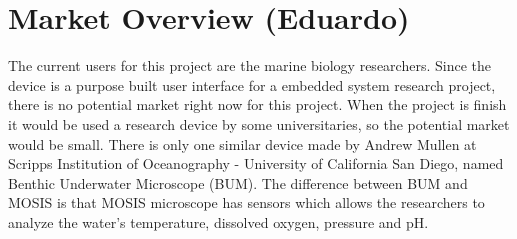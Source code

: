 \section{Market Overview (Eduardo)}
The current users for this project are the marine biology researchers. Since the device is a purpose built user interface for a embedded system research project, there is no potential market right now for this project. When the project is finish it would be used a research device by some universitaries, so the potential market would be small. There is only one similar device made by Andrew Mullen at Scripps Institution of Oceanography - University of California San Diego, named Benthic Underwater Microscope (BUM). The difference between BUM and MOSIS is that MOSIS microscope has sensors which allows the researchers to analyze the water's temperature, dissolved oxygen, pressure and pH.
